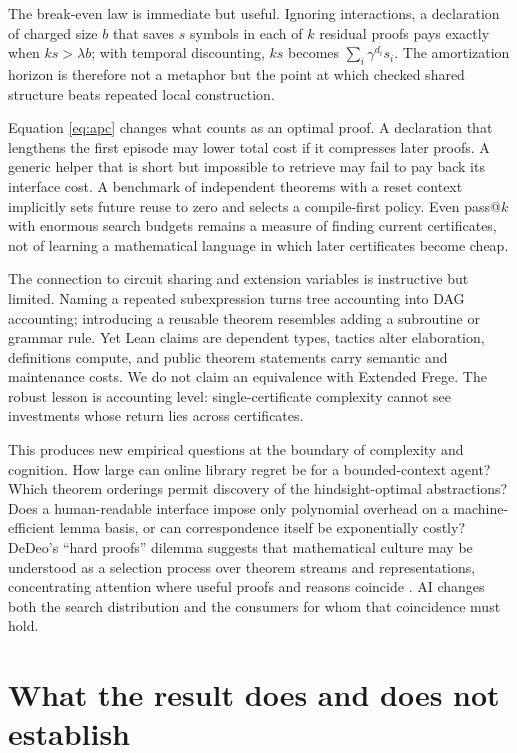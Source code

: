 \documentclass[10pt]{article}
\begin{document}
The break-even law is immediate but useful.  Ignoring interactions, a declaration of charged size
$b$ that saves $s$ symbols in each of $k$ residual proofs pays exactly when $ks>\lambda b$; with
temporal discounting, $ks$ becomes $\sum_i\gamma^{d_i}s_i$.  The amortization horizon is therefore
not a metaphor but the point at which checked shared structure beats repeated local construction.

Equation \eqref{eq:apc} changes what counts as an optimal proof.  A declaration that lengthens the
first episode may lower total cost if it compresses later proofs.  A generic helper that is short
but impossible to retrieve may fail to pay back its interface cost.  A benchmark of independent
theorems with a reset context implicitly sets future reuse to zero and selects a compile-first
policy.  Even pass@$k$ with enormous search budgets remains a measure of finding current
certificates, not of learning a mathematical language in which later certificates become cheap.

The connection to circuit sharing and extension variables is instructive but limited.  Naming a
repeated subexpression turns tree accounting into DAG accounting; introducing a reusable theorem
resembles adding a subroutine or grammar rule.  Yet Lean claims are dependent types, tactics alter
elaboration, definitions compute, and public theorem statements carry semantic and maintenance
costs.  We do not claim an equivalence with Extended Frege.  The robust lesson is accounting level:
single-certificate complexity cannot see investments whose return lies across certificates.

This produces new empirical questions at the boundary of complexity and cognition.  How large can
online library regret be for a bounded-context agent?  Which theorem orderings permit discovery of
the hindsight-optimal abstractions?  Does a human-readable interface impose only polynomial overhead
on a machine-efficient lemma basis, or can correspondence itself be exponentially costly?  DeDeo's
``hard proofs'' dilemma suggests that mathematical culture may be understood as a selection process
over theorem streams and representations, concentrating attention where useful proofs and reasons
coincide \citep{dedeo2024hard}.  AI changes both the search distribution and the consumers for whom
that coincidence must hold.

\section{What the result does and does not establish}
\end{document}
